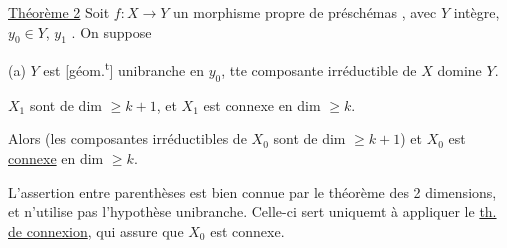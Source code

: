 
\uline{Théorème 2} Soit $f:X\longrightarrow Y$ un morphisme  propre de préschémas  , avec $Y$ intègre, $y_0\in Y$, $y_1$  . On suppose   %

 (a) $Y$ est [géom.\textsuperscript{t}] unibranche en $y_0$,  tte composante irréductible de $X$ domine $Y$.

   $X_1$ sont de dim $\geq k+1$, et $X_1$ est connexe en dim $\geq k$.

Alors (les composantes irréductibles de $X_0$ sont de dim $\geq k+1$) et $X_0$ est \uline{connexe} en dim $\geq k$.

L'assertion entre parenthèses est bien connue par le théorème des 2 dimensions, et n'utilise pas l'hypothèse unibranche. Celle-ci sert uniquemt à appliquer le \uline{th. de connexion}, qui assure que $X_0$ est connexe.

